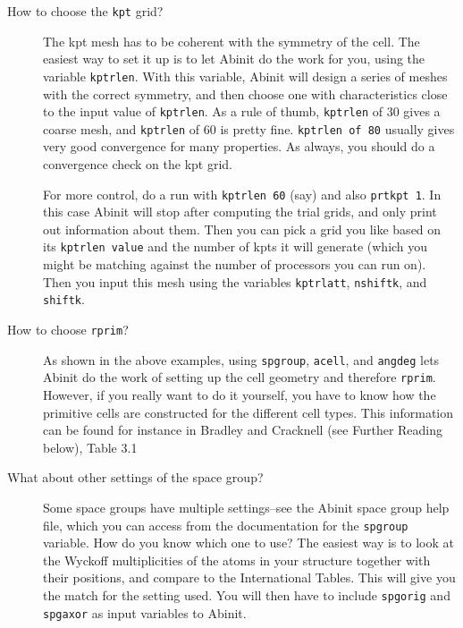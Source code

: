 \documentclass{article}
\begin{document}
\begin{description}

\item[How to choose the {\tt kpt} grid?] The kpt mesh has to be coherent with the symmetry of the cell. 
The easiest way to set it up is to let {\sc Abinit} do the work for you, using the variable {\tt kptrlen}. 
With this variable, {\sc Abinit} will design a series of meshes with the correct symmetry, and then choose
one with characteristics close to the input value of {\tt kptrlen}. As a rule of thumb, {\tt kptrlen} of 30 gives
a coarse mesh, and {\tt kptrlen} of 60 is pretty fine. {\tt kptrlen of 80} usually gives very good convergence for
many properties. As always, you should do a convergence check on the kpt grid. 

For more control, do a run with {\tt kptrlen 60} (say) and also {\tt prtkpt 1}. In this case {\sc Abinit} will stop
after computing the trial grids, and only print out information about them. Then you can pick a grid you like
based on its {\tt kptrlen value} and the number of kpts it will generate (which you might be matching against the
number of processors you can run on). Then you input this mesh using the variables {\tt kptrlatt}, {\tt nshiftk},
and {\tt shiftk}. 

\item[How to choose {\tt rprim}?]
As shown in the above examples, using {\tt spgroup}, {\tt acell}, and {\tt angdeg} lets {\sc Abinit} do the work of
setting up the cell geometry and therefore {\tt rprim}. However, if you really want to do it yourself, you have to know 
how the primitive cells are constructed for the different cell types. This information can be found for instance in Bradley
and Cracknell (see Further Reading below), Table 3.1

\item[What about other settings of the space group?]
Some space groups have multiple settings--see the {\sc Abinit} space group help file, which you can access from the
documentation for the {\tt spgroup} variable. How do you know which one to use? The easiest way is to look at the
Wyckoff multiplicities of the atoms in your structure together with their positions, and compare to the 
International Tables. This will give you the match for the setting used. You will then have to include {\tt spgorig}
and {\tt spgaxor} as input variables to {\sc Abinit}.


\end{description}
\end{document}
